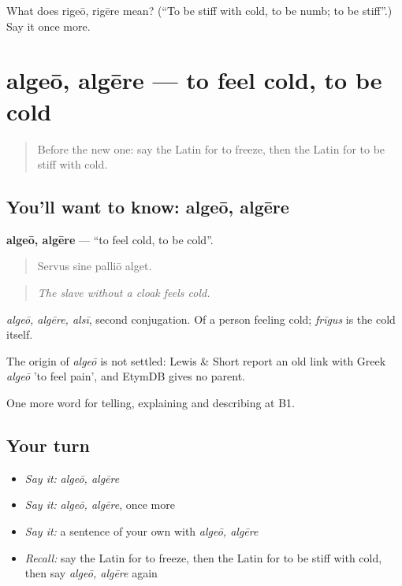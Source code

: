 \begin{tcolorbox}[breakable,colback=teal!4,colframe=teal!35!black,title={Before you move on}]
What does rigeō, rigēre mean? (\textquotedblleft{}To be stiff with cold, to be numb; to be stiff\textquotedblright{}.) Say it once more.
\end{tcolorbox}
\section[algeō, algēre]{algeō, algēre — to feel cold, to be cold}

\label{lesson:LA-C486-algeo}



\begin{quote}
Before the new one: say the Latin for to freeze, then the Latin for to be stiff with cold.
\end{quote}

\subsection*{You'll want to know: algeō, algēre}
\textbf{algeō, algēre} — \textquotedblleft{}to feel cold, to be cold\textquotedblright{}.

\begin{quote}
Servus sine palliō alget.
\end{quote}

\begin{quote}
\emph{The slave without a cloak feels cold.}
\end{quote}

\emph{algeō, algēre, alsī}, second conjugation. Of a person feeling cold; \emph{frīgus} is the cold itself.

\begin{cousinweb}
The origin of \emph{algeō} is not settled: Lewis \& Short report an old link with Greek \emph{algeō} 'to feel pain', and EtymDB gives no parent.
\end{cousinweb}

\begin{grammarlens}[title={What you've built}]
One more word for telling, explaining and describing at B1.
\end{grammarlens}

\subsection*{Your turn}
\begin{itemize}
\raggedright
  \item \emph{Say it:} \emph{algeō, algēre}
  \item \emph{Say it:} \emph{algeō, algēre}, once more
  \item \emph{Say it:} a sentence of your own with \emph{algeō, algēre}
  \item \emph{Recall:} say the Latin for to freeze, then the Latin for to be stiff with cold, then say \emph{algeō, algēre} again
\end{itemize}

